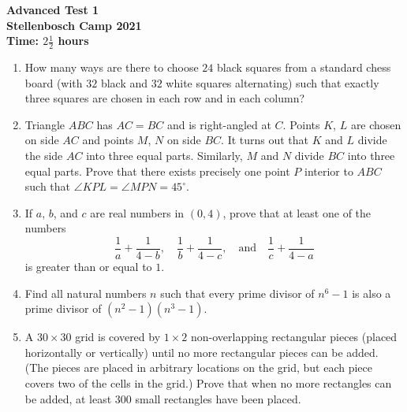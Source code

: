 \documentclass{article}
\begin{document}
\thispagestyle{empty}

\begin{center}
  \textbf{\Large Advanced Test 1}
  \\ \vspace{1em}
  \textbf{\large Stellenbosch Camp 2021}
  \\ \vspace{1em}
  \textbf{\large Time: $2\frac{1}{2}$ hours}
\end{center}

\vspace{24pt}

\begin{enumerate}[1.]

\item %
How many ways are there to choose $24$ black squares from a standard chess board (with $32$ black and $32$ white squares alternating) such that exactly three squares are chosen in each row and in each column?


\item %
Triangle $ABC$ has $AC=BC$ and is right-angled at $C$. Points $K$, $L$ are chosen on side $AC$ and points $M$, $N$ on side $BC$. It turns out that $K$ and $L$ divide the side $AC$ into three equal parts. Similarly, $M$ and $N$ divide $BC$ into three equal parts. Prove that there exists precisely one point $P$ interior to $ABC$ such that $\angle KPL = \angle MPN = 45^{\circ}$.


\item %
If $a$, $b$, and $c$ are real numbers in $(0,4)$, prove that at least one of the numbers
\[ \frac{1}{a} +\frac{1}{4-b}, \quad \frac{1}{b} +\frac{1}{4-c}, \quad\text{and}\quad \frac{1}{c} +\frac{1}{4-a} \]
is greater than or equal to $1$.


\item %
Find all natural numbers $n$ such that every prime divisor of $n^6 - 1$ is also a prime divisor of $(n^2 - 1)(n^3 - 1)$. 


\item %
A $30 \times 30$ grid is covered by $1 \times 2$ non-overlapping rectangular pieces (placed horizontally or vertically) until no more rectangular pieces can be added. (The pieces are placed in arbitrary locations on the grid, but each piece covers two of the cells in the grid.) Prove that when no more rectangles can be added, at least $300$ small rectangles have been placed.

\end{enumerate}
\end{document}
